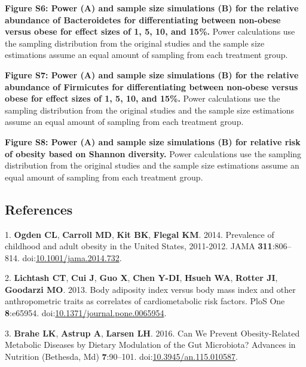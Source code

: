 \documentclass[12pt,]{article}
\begin{document}
\textbf{Figure S6: Power (A) and sample size simulations (B) for the
relative abundance of Bacteroidetes for differentiating between
non-obese versus obese for effect sizes of 1, 5, 10, and 15\%.} Power
calculations use the sampling distribution from the original studies and
the sample size estimations assume an equal amount of sampling from each
treatment group.

\textbf{Figure S7: Power (A) and sample size simulations (B) for the
relative abundance of Firmicutes for differentiating between non-obese
versus obese for effect sizes of 1, 5, 10, and 15\%.} Power calculations
use the sampling distribution from the original studies and the sample
size estimations assume an equal amount of sampling from each treatment
group.

\textbf{Figure S8: Power (A) and sample size simulations (B) for
relative risk of obesity based on Shannon diversity.} Power calculations
use the sampling distribution from the original studies and the sample
size estimations assume an equal amount of sampling from each treatment
group.

\newpage

\subsection*{References}\label{references}

\hypertarget{refs}{}
\hypertarget{ref-ogdenux5fprevalenceux5f2014}{}
1. \textbf{Ogden CL}, \textbf{Carroll MD}, \textbf{Kit BK},
\textbf{Flegal KM}. 2014. Prevalence of childhood and adult obesity in
the United States, 2011-2012. JAMA \textbf{311}:806--814.
doi:\href{https://doi.org/10.1001/jama.2014.732}{10.1001/jama.2014.732}.

\hypertarget{ref-lichtashux5fbodyux5f2013}{}
2. \textbf{Lichtash CT}, \textbf{Cui J}, \textbf{Guo X}, \textbf{Chen
Y-DI}, \textbf{Hsueh WA}, \textbf{Rotter JI}, \textbf{Goodarzi MO}.
2013. Body adiposity index versus body mass index and other
anthropometric traits as correlates of cardiometabolic risk factors.
PloS One \textbf{8}:e65954.
doi:\href{https://doi.org/10.1371/journal.pone.0065954}{10.1371/journal.pone.0065954}.

\hypertarget{ref-braheux5fcanux5f2016}{}
3. \textbf{Brahe LK}, \textbf{Astrup A}, \textbf{Larsen LH}. 2016. Can
We Prevent Obesity-Related Metabolic Diseases by Dietary Modulation of
the Gut Microbiota? Advances in Nutrition (Bethesda, Md)
\textbf{7}:90--101.
doi:\href{https://doi.org/10.3945/an.115.010587}{10.3945/an.115.010587}.
\end{document}
